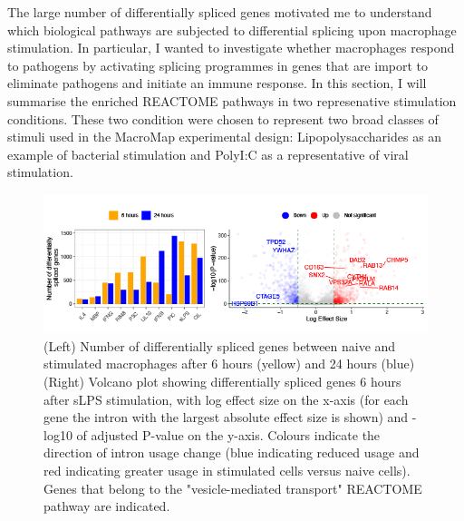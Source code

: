 The large number of differentially spliced genes motivated me to understand which biological pathways are subjected to differential splicing upon macrophage stimulation. In particular, I wanted to investigate whether macrophages respond to pathogens by activating splicing programmes in genes that are import to eliminate pathogens and initiate an immune response. In this section, I will summarise the enriched REACTOME pathways in two represenative stimulation conditions. These two condition were chosen to represent two broad classes of stimuli used in the MacroMap experimental design: Lipopolysaccharides as an example of bacterial stimulation and PolyI:C as a representative of viral stimulation.\\




\begin{figure}[H]
  \centering
  \includegraphics[width=\textwidth]{Vector/ds.png}
  \caption{(Left) Number of differentially spliced genes between naive and stimulated macrophages after 6 hours (yellow) and 24 hours (blue) (Right) Volcano plot showing differentially spliced genes 6 hours after sLPS stimulation, with log effect size on the x-axis (for each gene the intron with the largest absolute effect size is shown) and -log10 of adjusted P-value on the y-axis. Colours indicate the direction of intron usage change (blue indicating reduced usage and red indicating greater usage in stimulated cells versus naive cells). Genes that belong to the "vesicle-mediated transport" REACTOME pathway are indicated.}
  \label{fig:ds}   
\end{figure}
